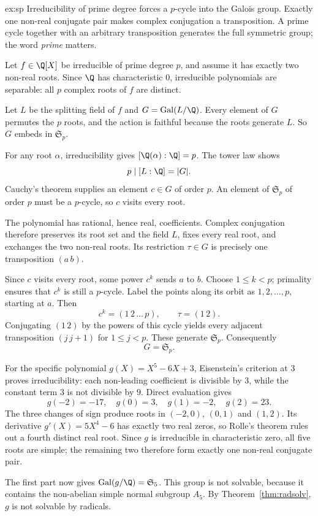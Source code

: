 \begin{solution}{ex:sp}
\idea Irreducibility of prime degree forces a $p$-cycle into the Galois group. Exactly one non-real conjugate pair makes complex conjugation a transposition. A prime cycle together with an arbitrary transposition generates the full symmetric group; the word \emph{prime} matters.

\writeup Let $f\in\Q[X]$ be irreducible of prime degree $p$, and assume it has exactly two non-real roots. Since $\Q$ has characteristic $0$, irreducible polynomials are separable: all $p$ complex roots of $f$ are distinct.

Let $L$ be the splitting field of $f$ and $G=\operatorname{Gal}(L/\Q)$. Every element of $G$ permutes the $p$ roots, and the action is faithful because the roots generate $L$. So $G$ embeds in $\mathfrak S_p$.

For any root $\alpha$, irreducibility gives $[\Q(\alpha):\Q]=p$. The tower law shows
\[
p\mid[L:\Q]=|G|.
\]
Cauchy's theorem supplies an element $c\in G$ of order $p$. An element of $\mathfrak S_p$ of order $p$ must be a $p$-cycle, so $c$ visits every root.

The polynomial has rational, hence real, coefficients. Complex conjugation therefore preserves its root set and the field $L$, fixes every real root, and exchanges the two non-real roots. Its restriction $\tau\in G$ is precisely one transposition $(a\,b)$.

Since $c$ visits every root, some power $c^k$ sends $a$ to $b$. Choose $1\le k<p$; primality ensures that $c^k$ is still a $p$-cycle. Label the points along its orbit as $1,2,\ldots,p$, starting at $a$. Then
\[
c^k=(1\,2\,\dots\,p),\qquad \tau=(1\,2).
\]
Conjugating $(1\,2)$ by the powers of this cycle yields every adjacent transposition $(j\,j+1)$ for $1\le j<p$. These generate $\mathfrak S_p$. Consequently
\[
\boxed{G=\mathfrak S_p}.
\]

For the specific polynomial $g(X)=X^5-6X+3$, Eisenstein's criterion at $3$ proves irreducibility: each non-leading coefficient is divisible by $3$, while the constant term $3$ is not divisible by $9$. Direct evaluation gives
\[
g(-2)=-17,\quad g(0)=3,\quad
g(1)=-2,\quad g(2)=23.
\]
The three changes of sign produce roots in $(-2,0)$, $(0,1)$ and $(1,2)$. Its derivative $g'(X)=5X^4-6$ has exactly two real zeros, so Rolle's theorem rules out a fourth distinct real root. Since $g$ is irreducible in characteristic zero, all five roots are simple; the remaining two therefore form exactly one non-real conjugate pair.

The first part now gives $\operatorname{Gal}(g/\Q)=\mathfrak S_5$. This group is not solvable, because it contains the non-abelian simple normal subgroup $A_5$. By Theorem~\ref{thm:radsolv}, $g$ is not solvable by radicals.
\end{solution}


